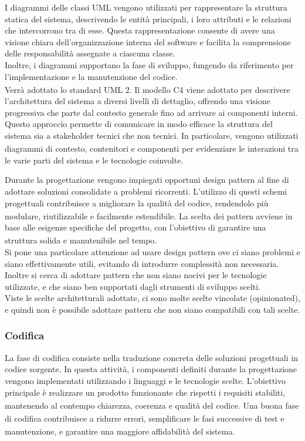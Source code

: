 \documentclass[a4paper,11pt]{article}
\newcommand{\G}{\textsubscript{\scalebox{0.6}{\textbf{G}}}}
\begin{document}
I diagrammi delle classi UML vengono utilizzati per rappresentare la struttura statica del sistema, descrivendo le entità 
principali, i loro attributi e le relazioni che intercorrono tra di esse. Questa rappresentazione consente di avere una visione 
chiara dell'organizzazione interna del software e facilita la comprensione delle responsabilità assegnate a ciascuna classe. \\
Inoltre, i diagrammi supportano la fase di sviluppo, fungendo da riferimento per l'implementazione\G{} e la manutenzione del codice.\\
Verrà adottato lo standard UML 2.
Il modello C4 viene adottato per descrivere l'architettura del sistema a diversi livelli di dettaglio, offrendo una visione 
progressiva che parte dal contesto generale fino ad arrivare ai componenti interni. Questo approccio permette di comunicare in
modo efficace la struttura del sistema sia a stakeholder\G{} tecnici che non tecnici. In particolare, vengono utilizzati diagrammi di 
contesto, contenitori e componenti per evidenziare le interazioni tra le varie parti del sistema e le tecnologie coinvolte.

Durante la progettazione vengono impiegati opportuni design pattern al fine di adottare soluzioni consolidate a problemi ricorrenti. 
L'utilizzo di questi schemi progettuali contribuisce a migliorare la qualità\G{} del codice, rendendolo più modulare, riutilizzabile e 
facilmente estendibile. La scelta dei pattern avviene in base alle esigenze specifiche del progetto\G{}, con l'obiettivo di garantire 
una struttura solida e manutenibile nel tempo. \\
Si pone una particolare attenzione ad usare design pattern ove ci siano problemi e siano effettivamente utili, evitando di 
introdurre complessità non necessaria. Inoltre si cerca di adottare pattern che non siano nocivi per le tecnologie utilizzate, 
e che siano ben supportati dagli strumenti di sviluppo scelti.\\
Viste le scelte architetturali adottate, ci sono molte scelte vincolate (opinionated), e quindi non è possibile adottare pattern che non siano 
compatibili con tali scelte.

\subsubsection{Codifica}
La fase di codifica consiste nella traduzione concreta delle soluzioni progettuali in codice sorgente. 
In questa attività, i componenti definiti durante la progettazione vengono implementati utilizzando i 
linguaggi e le tecnologie scelte. L'obiettivo principale è realizzare un prodotto\G{} funzionante che rispetti 
i requisiti stabiliti, mantenendo al contempo chiarezza, coerenza e qualità\G{} del codice. Una buona fase di 
codifica contribuisce a ridurre errori, semplificare le fasi successive di test\G{} e manutenzione, e 
garantire una maggiore affidabilità\G{} del sistema.
\end{document}
